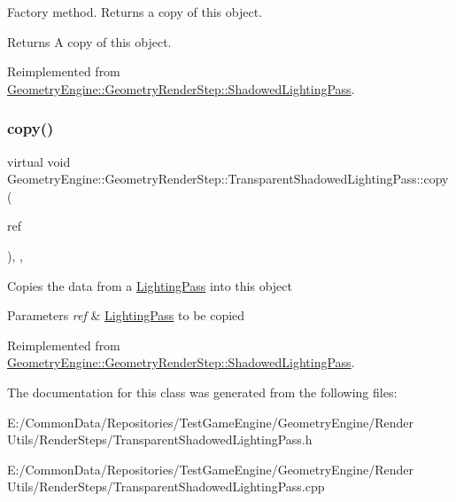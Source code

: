 Factory method. Returns a copy of this object. \begin{DoxyReturn}{Returns}
A copy of this object. 
\end{DoxyReturn}


Reimplemented from \mbox{\hyperlink{class_geometry_engine_1_1_geometry_render_step_1_1_shadowed_lighting_pass_a73176d6860aee0903034eeaf93edb40d}{Geometry\+Engine\+::\+Geometry\+Render\+Step\+::\+Shadowed\+Lighting\+Pass}}.

\mbox{\label{class_geometry_engine_1_1_geometry_render_step_1_1_transparent_shadowed_lighting_pass_ab88135daf4e0001a39ce4d9b4b7ff197}} 
\subsubsection{\texorpdfstring{copy()}{copy()}}
{\footnotesize\ttfamily virtual void Geometry\+Engine\+::\+Geometry\+Render\+Step\+::\+Transparent\+Shadowed\+Lighting\+Pass\+::copy (\begin{DoxyParamCaption}\item[{const \mbox{\hyperlink{class_geometry_engine_1_1_geometry_render_step_1_1_shadowed_lighting_pass}{Shadowed\+Lighting\+Pass}} \&}]{ref }\end{DoxyParamCaption})\hspace{0.3cm}{\ttfamily [inline]}, {\ttfamily [protected]}, {\ttfamily [virtual]}}

Copies the data from a \mbox{\hyperlink{class_geometry_engine_1_1_geometry_render_step_1_1_lighting_pass}{Lighting\+Pass}} into this object 
\begin{DoxyParams}{Parameters}
{\em ref} & \mbox{\hyperlink{class_geometry_engine_1_1_geometry_render_step_1_1_lighting_pass}{Lighting\+Pass}} to be copied \\
\hline
\end{DoxyParams}


Reimplemented from \mbox{\hyperlink{class_geometry_engine_1_1_geometry_render_step_1_1_shadowed_lighting_pass_add7b889c49a68911f675ee44ab656699}{Geometry\+Engine\+::\+Geometry\+Render\+Step\+::\+Shadowed\+Lighting\+Pass}}.



The documentation for this class was generated from the following files\+:\begin{DoxyCompactItemize}
\item 
E\+:/\+Common\+Data/\+Repositories/\+Test\+Game\+Engine/\+Geometry\+Engine/\+Render Utils/\+Render\+Steps/Transparent\+Shadowed\+Lighting\+Pass.\+h\item 
E\+:/\+Common\+Data/\+Repositories/\+Test\+Game\+Engine/\+Geometry\+Engine/\+Render Utils/\+Render\+Steps/Transparent\+Shadowed\+Lighting\+Pass.\+cpp\end{DoxyCompactItemize}
